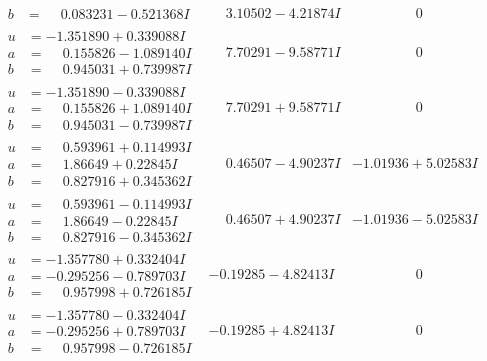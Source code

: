 \documentclass[1p]{elsarticle_modified}
\theoremstyle{definition}
\begin{document}
$$\begin{array}{c|c|c}
\begin{aligned}
b &= \phantom{-}0.083231 - 0.521368 I\end{aligned}
 & \phantom{-}3.10502 - 4.21874 I & \phantom{-0.000000 } 0 \\ \hline\begin{aligned}
u &= -1.351890 + 0.339088 I \\
a &= \phantom{-}0.155826 - 1.089140 I \\
b &= \phantom{-}0.945031 + 0.739987 I\end{aligned}
 & \phantom{-}7.70291 - 9.58771 I & \phantom{-0.000000 } 0 \\ \hline\begin{aligned}
u &= -1.351890 - 0.339088 I \\
a &= \phantom{-}0.155826 + 1.089140 I \\
b &= \phantom{-}0.945031 - 0.739987 I\end{aligned}
 & \phantom{-}7.70291 + 9.58771 I & \phantom{-0.000000 } 0 \\ \hline\begin{aligned}
u &= \phantom{-}0.593961 + 0.114993 I \\
a &= \phantom{-}1.86649 + 0.22845 I \\
b &= \phantom{-}0.827916 + 0.345362 I\end{aligned}
 & \phantom{-}0.46507 - 4.90237 I & -1.01936 + 5.02583 I \\ \hline\begin{aligned}
u &= \phantom{-}0.593961 - 0.114993 I \\
a &= \phantom{-}1.86649 - 0.22845 I \\
b &= \phantom{-}0.827916 - 0.345362 I\end{aligned}
 & \phantom{-}0.46507 + 4.90237 I & -1.01936 - 5.02583 I \\ \hline\begin{aligned}
u &= -1.357780 + 0.332404 I \\
a &= -0.295256 - 0.789703 I \\
b &= \phantom{-}0.957998 + 0.726185 I\end{aligned}
 & -0.19285 - 4.82413 I & \phantom{-0.000000 } 0 \\ \hline\begin{aligned}
u &= -1.357780 - 0.332404 I \\
a &= -0.295256 + 0.789703 I \\
b &= \phantom{-}0.957998 - 0.726185 I\end{aligned}
 & -0.19285 + 4.82413 I & \phantom{-0.000000 } 0 \\ \hline\begin{aligned}

\end{aligned}
\end{array}$$
\end{document}
